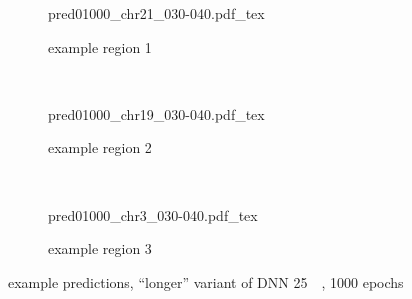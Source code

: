 \begin{figure}[p]
    \begin{subfigure}{\textwidth}
        \centering
        \scriptsize
        {pred01000_chr21_030-040.pdf_tex}
        \caption{example  region 1} \label{fig:results:longer_r1}
    \end{subfigure}\\[6mm]
    \begin{subfigure}{\textwidth}
        \centering
        \scriptsize
        {pred01000_chr19_030-040.pdf_tex}
        \caption{example region 2} \label{fig:results:longer_r2}
    \end{subfigure}\\[6mm]
    \begin{subfigure}{\textwidth}
        \centering
        \scriptsize
        {pred01000_chr3_030-040.pdf_tex}
        \caption{example region 3} \label{fig:results:longer_r3}
    \end{subfigure}
    \caption{example predictions, ``longer'' variant of DNN \SI{25}{\kilo\bp}, 1000 epochs} \label{fig:results:longer_matrices}
\end{figure}

